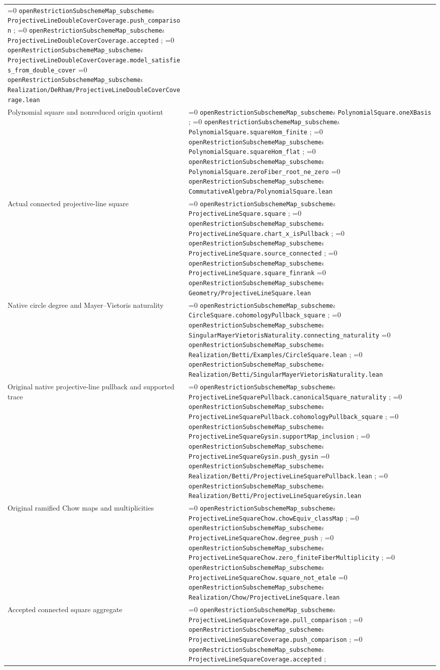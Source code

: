 \documentclass[11pt]{article}
\theoremstyle{definition}
\theoremstyle{remark}
\newcommand{\leanpath}[1]{%
  \ifnum\pdfstrcmp{\detokenize{#1}}%
      {\detokenize{openRestrictionSubschemeMap_subschemeι}}=0
    \texttt{\nolinkurl{openRestrictionSubschemeMap_subscheme}}\ensuremath{\iota}%
  \else
    \texttt{\nolinkurl{#1}}%
  \fi}
\begin{document}
\begin{longtable}{@{}>{\raggedright\arraybackslash}p{}
                >{\raggedright\arraybackslash}p{}@{}}
\leanpath{ProjectiveLineDoubleCoverCoverage.push_comparison};
\leanpath{ProjectiveLineDoubleCoverCoverage.accepted};
\leanpath{ProjectiveLineDoubleCoverCoverage.model_satisfies_from_double_cover}\newline
\leanpath{Realization/DeRham/ProjectiveLineDoubleCoverCoverage.lean}\\
Polynomial square and nonreduced origin quotient &
\leanpath{PolynomialSquare.oneXBasis};
\leanpath{PolynomialSquare.squareHom_finite};
\leanpath{PolynomialSquare.squareHom_flat};
\leanpath{PolynomialSquare.zeroFiber_root_ne_zero}\newline
\leanpath{CommutativeAlgebra/PolynomialSquare.lean}\\
Actual connected projective-line square &
\leanpath{ProjectiveLineSquare.square};
\leanpath{ProjectiveLineSquare.chart_x_isPullback};
\leanpath{ProjectiveLineSquare.source_connected};
\leanpath{ProjectiveLineSquare.square_finrank}\newline
\leanpath{Geometry/ProjectiveLineSquare.lean}\\
Native circle degree and Mayer--Vietoris naturality &
\leanpath{CircleSquare.cohomologyPullback_square};
\leanpath{SingularMayerVietorisNaturality.connecting_naturality}\newline
\leanpath{Realization/Betti/Examples/CircleSquare.lean};
\leanpath{Realization/Betti/SingularMayerVietorisNaturality.lean}\\
Original native projective-line pullback and supported trace &
\leanpath{ProjectiveLineSquarePullback.canonicalSquare_naturality};
\leanpath{ProjectiveLineSquarePullback.cohomologyPullback_square};
\leanpath{ProjectiveLineSquareGysin.supportMap_inclusion};
\leanpath{ProjectiveLineSquareGysin.push_gysin}\newline
\leanpath{Realization/Betti/ProjectiveLineSquarePullback.lean};
\leanpath{Realization/Betti/ProjectiveLineSquareGysin.lean}\\
Original ramified Chow maps and multiplicities &
\leanpath{ProjectiveLineSquareChow.chowEquiv_classMap};
\leanpath{ProjectiveLineSquareChow.degree_push};
\leanpath{ProjectiveLineSquareChow.zero_finiteFiberMultiplicity};
\leanpath{ProjectiveLineSquareChow.square_not_etale}\newline
\leanpath{Realization/Chow/ProjectiveLineSquare.lean}\\
Accepted connected square aggregate &
\leanpath{ProjectiveLineSquareCoverage.pull_comparison};
\leanpath{ProjectiveLineSquareCoverage.push_comparison};
\leanpath{ProjectiveLineSquareCoverage.accepted};\newline

\end{longtable}
\end{document}
